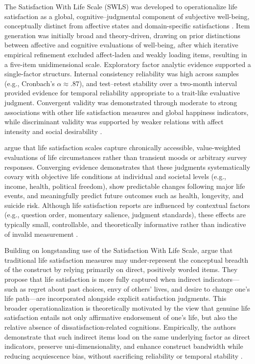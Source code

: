 \documentclass[jou,floatsintext]{apa7}
\begin{document}
The Satisfaction With Life Scale (SWLS) was developed to operationalize life satisfaction as a global, cognitive–judgmental component of subjective well-being, conceptually distinct from affective states and domain-specific satisfactions \parencite{dienerSatisfactionLifeScale1985}. Item generation was initially broad and theory-driven, drawing on prior distinctions between affective and cognitive evaluations of well-being, after which iterative empirical refinement excluded affect-laden and weakly loading items, resulting in a five-item unidimensional scale. Exploratory factor analytic evidence supported a single-factor structurs. Internal consistency reliability was high across samples (e.g., Cronbach’s $\alpha \approx .87$), and test–retest stability over a two-month interval provided evidence for temporal reliability appropriate to a trait-like evaluative judgment. Convergent validity was demonstrated through moderate to strong associations with other life satisfaction measures and global happiness indicators, while discriminant validity was supported by weaker relations with affect intensity and social desirability \parencite{dienerSatisfactionLifeScale1985}.


\textcite{dienerTheoryValidityLife2013} argue that life satisfaction scales capture chronically accessible, value-weighted evaluations of life circumstances rather than transient moods or arbitrary survey responses. Converging evidence demonstrates that these judgments systematically covary with objective life conditions at individual and societal levels (e.g., income, health, political freedom), show predictable changes following major life events, and meaningfully predict future outcomes such as health, longevity, and suicide risk. Although life satisfaction reports are influenced by contextual factors (e.g., question order, momentary salience, judgment standards), these effects are typically small, controllable, and theoretically informative rather than indicative of invalid measurement \parencite{dienerTheoryValidityLife2013}.

Building on longstanding use of the Satisfaction With Life Scale, \textcite{margolisNewMeasureLife2019} argue that traditional life satisfaction measures may under-represent the conceptual breadth of the construct by relying primarily on direct, positively worded items. They propose that life satisfaction is more fully captured when indirect indicators—such as regret about past choices, envy of others’ lives, and desire to change one’s life path—are incorporated alongside explicit satisfaction judgments. This broader operationalization is theoretically motivated by the view that genuine life satisfaction entails not only affirmative endorsement of one’s life, but also the relative absence of dissatisfaction-related cognitions. Empirically, the authors demonstrate that such indirect items load on the same underlying factor as direct indicators, preserve uni-dimensionality, and enhance construct bandwidth while reducing acquiescence bias, without sacrificing reliability or temporal stability \parencite{margolisNewMeasureLife2019}.
\end{document}
